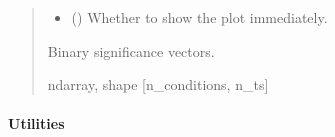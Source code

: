 \documentclass[letterpaper,10pt,english]{sphinxhowto}
\begin{document}
\begin{fulllineitems}
\begin{quote}
\begin{description}
\begin{itemize}
\item {} 
\sphinxAtStartPar
{} (\sphinxstyleliteralemphasis{\sphinxupquote{, }}) \textendash{} Whether to show the plot immediately.

\end{itemize}

\sphinxAtStartPar
{} \textendash{} Binary significance vectors.

\sphinxAtStartPar
ndarray, shape {[}n\_conditions, n\_ts{]}

\end{description}\end{quote}

\end{fulllineitems}


\sphinxstepscope

\clearpage


\paragraph{Utilities}
\label{\detokenize{stuff:utilities}}\label{\detokenize{stuff::doc}}
\sphinxAtStartPar
{}
\end{document}
